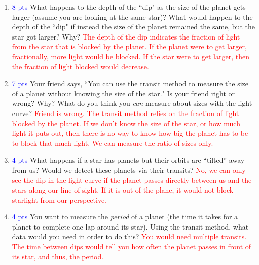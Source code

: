 \documentclass[11pt]{article}
\begin{document}
\begin{enumerate}
    \item \textcolor{blue}{8 pts} What happens to the depth of the ``dip" as the size of the planet gets larger (assume you are looking at the same star)? What would happen to the depth of the ``dip" if instead the size of the planet remained the same, but the star got larger?  Why?
    \textcolor{red}{The depth of the dip indicates the fraction of light from the star that is blocked by the planet.  If the planet were to get larger, fractionally, more light would be blocked.  If the star were to get larger, then the fraction of light blocked would decrease.}
    
    \item \textcolor{blue}{7 pts} Your friend says, ``You can use the transit method to measure the size of a planet without knowing the size of the star." Is your friend right or wrong? Why? What do you think you \textit{can} measure about sizes with the light curve?
    \textcolor{red}{Friend is wrong. The transit method relies on the fraction of light blocked by the planet.  If we don't know the size of the star, or how much light it puts out, then there is no way to know how big the planet has to be to block that much light.  We can measure the ratio of sizes only.}
    
    \item \textcolor{blue}{4 pts} What happens if a star has planets but their orbits are “tilted” away from us? Would we detect these planets via their transits? \textcolor{red}{No, we can only see the dip in the light curve if the planet passes directly between us and the stars along our line-of-sight.  If it is out of the plane, it would not block starlight from our perspective.}
    
    \item \textcolor{blue}{4 pts} You want to measure the \textit{period} of a planet (the time it takes for a planet to complete one lap around its star). Using the transit method, what data would you need in order to do this? \textcolor{red}{You would need multiple transits.  The time between dips would tell you how often the planet passes in front of its star, and thus, the period.}
    
\end{enumerate}
\end{document}
